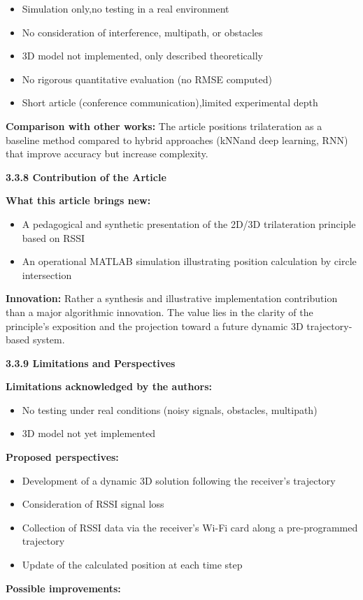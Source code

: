 \documentclass{ipgpmaster}
\begin{document}
\begin{itemize}
    \item Simulation only,no testing in a real environment
    \item No consideration of interference, multipath, or obstacles
    \item 3D model not implemented, only described theoretically
    \item No rigorous quantitative evaluation (no RMSE computed)
    \item Short article (conference communication),limited experimental depth
\end{itemize}
\textbf{Comparison with other works:} The article positions trilateration as a baseline method compared to hybrid approaches (kNNand  deep learning, RNN) that improve accuracy but increase complexity.

 \textbf{3.3.8      Contribution of the Article}

\textbf{What this article brings new:}

\begin{itemize}
    \item A pedagogical and synthetic presentation of the 2D/3D trilateration principle based on RSSI
    \item An operational MATLAB simulation illustrating position calculation by circle intersection
\end{itemize}
\textbf{Innovation:} Rather a synthesis and illustrative implementation contribution than a major algorithmic innovation. The value lies in the clarity of the principle's exposition and the projection toward a future dynamic 3D trajectory-based system.

 \textbf{3.3.9   Limitations and Perspectives}

\textbf{Limitations acknowledged by the authors:}

\begin{itemize}
    \item No testing under real conditions (noisy signals, obstacles, multipath)
    \item 3D model not yet implemented
\end{itemize}
\textbf{Proposed perspectives:}

\begin{itemize}
    \item Development of a dynamic 3D solution following the receiver's trajectory
    \item Consideration of RSSI signal loss
    \item Collection of RSSI data via the receiver's Wi-Fi card along a pre-programmed trajectory
    \item Update of the calculated position at each time step
\end{itemize}
\textbf{Possible improvements:}
\end{document}
